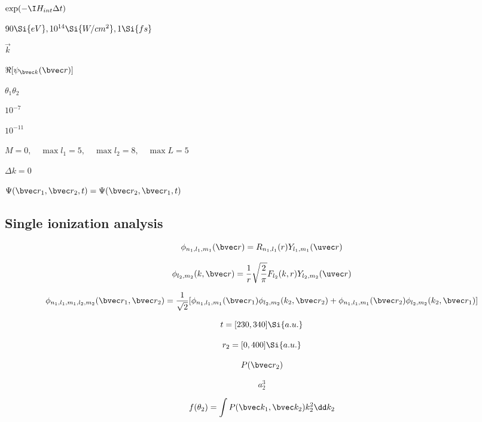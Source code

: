$\exp(-\I H_{int}\Delta t)$

$90\Si{eV}, 10^{14} \Si{W/cm^2}, 1\Si{fs}$

$\vec k$

$\Re [\psi_{\bvec k}(\bvec r)]$

$\theta_1 \theta_2$

$10^{-7}$

$10^{-11}$

$M = 0, \quad\max{l_1} = 5, \quad\max{l_2} = 8, \quad\max{L} = 5$

$\Delta k = 0$

$\Psi(\bvec r_1, \bvec r_2, t) = \Psi(\bvec r_2, \bvec r_1, t)$

\subsection{Single ionization analysis}
\begin{equation}
\phi_{n_1, l_1, m_1}(\bvec r) = R_{n_1,l_1}(r)Y_{l_1,m_1}(\uvec r)
\end{equation}

\begin{equation}
\phi_{l_2, m_2}(k, \bvec r) = \frac{1}{r}\sqrt{\frac{2}{\pi}} F_{l_2}(k, r) Y_{l_2, m_2} (\uvec r)
\end{equation}

\begin{equation}
\phi_{n_1, l_1, m_1, l_2, m_2}(\bvec r_1, \bvec r_2) = \frac{1}{\sqrt{2}} [\phi_{n_1, l_1, m_1}(\bvec r_1)\phi_{l_2, m_2}(k_2, \bvec r_2) + \phi_{n_1, l_1, m_1}(\bvec r_2)\phi_{l_2, m_2}(k_2, \bvec r_1)]
\end{equation}

\begin{equation}
t = [230, 340] \Si{a.u.}
\end{equation}

\begin{equation}
r_2 = [0,400] \Si{a.u.}
\end{equation}

\begin{equation}
P(\bvec r_2)
\end{equation}

\begin{equation}
a_2^3
\end{equation}

\begin{equation}
f(\theta_2) = \int P(\bvec k_1, \bvec k_2) k_2^2 \dd k_2
\end{equation}

